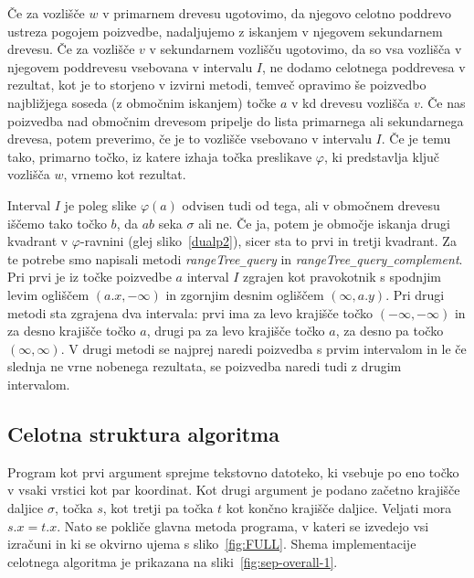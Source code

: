 \documentclass[a4paper, 12pt]{book}
\newcommand{\U}{\texttt{\_}}
\begin{document}
Če za vozlišče $w$ v primarnem drevesu ugotovimo, da njegovo celotno poddrevo ustreza pogojem poizvedbe, nadaljujemo z iskanjem v njegovem sekundarnem drevesu. Če za vozlišče $v$ v sekundarnem vozlišču ugotovimo, da so vsa vozlišča v njegovem poddrevesu vsebovana v intervalu $I$, ne dodamo celotnega poddrevesa v rezultat, kot je to storjeno v izvirni metodi, temveč opravimo še poizvedbo najbližjega soseda (z območnim iskanjem) točke $a$ v kd drevesu vozlišča $v$. Če nas poizvedba nad območnim drevesom pripelje do lista primarnega ali sekundarnega drevesa, potem preverimo, če je to vozlišče vsebovano v intervalu $I$. Če je temu tako, primarno točko, iz katere izhaja točka preslikave $\varphi$, ki predstavlja ključ vozlišča $w$, vrnemo kot rezultat.

Interval $I$ je poleg slike $\varphi (a)$ odvisen tudi od tega, ali v območnem drevesu iščemo tako točko $b$, da $ab$ seka $\sigma$ ali ne. Če ja, potem je območje iskanja drugi kvadrant v $\varphi$-ravnini (glej sliko~\ref{dualp2}), sicer sta to prvi in tretji kvadrant. Za te potrebe smo napisali metodi \textit{rangeTree\U query} in \textit{rangeTree\U query\U complement}. Pri prvi je iz točke poizvedbe $a$ interval $I$ zgrajen kot pravokotnik s spodnjim levim ogliščem $(a.x, -\infty)$ in zgornjim desnim ogliščem $(\infty, a.y)$. Pri drugi metodi sta zgrajena dva intervala: prvi ima za levo krajišče točko $(-\infty, -\infty)$ in za desno krajišče točko $a$, drugi pa za levo krajišče točko $a$, za desno pa točko $(\infty, \infty)$. V drugi metodi se najprej naredi poizvedba s prvim intervalom in le če slednja ne vrne nobenega rezultata, se poizvedba naredi tudi z drugim intervalom.

\subsection{Celotna struktura algoritma}

Program kot prvi argument sprejme tekstovno datoteko, ki vsebuje po eno točko v vsaki vrstici kot par koordinat. Kot drugi argument je podano začetno krajišče daljice $\sigma$, točka $s$, kot tretji pa točka $t$ kot končno krajišče daljice. Veljati mora $s.x = t.x$. Nato se pokliče glavna metoda programa, v kateri se izvedejo vsi izračuni in ki se okvirno ujema s sliko~\ref{fig:FULL}. Shema implementacije celotnega algoritma je prikazana na sliki~\ref{fig:sep-overall-1}.
\end{document}

